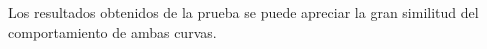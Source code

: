 \documentclass[12pt,a4paper]{article}
\begin{document}
\begin{itemize}
	Los resultados obtenidos de la prueba se puede apreciar la gran similitud del comportamiento de ambas curvas.
	

	

\end{itemize}
\end{document}
